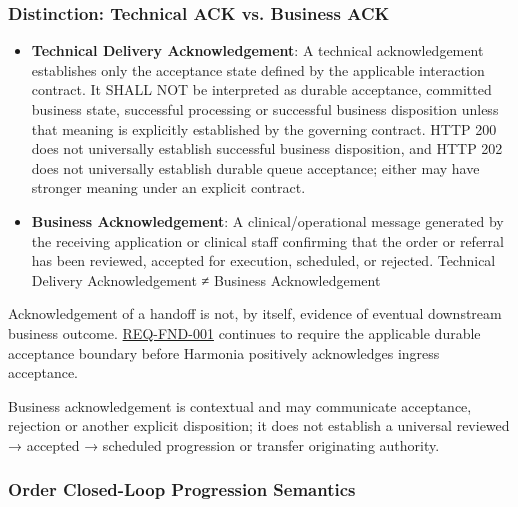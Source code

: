 \subsubsection*{Distinction: Technical ACK vs. Business ACK}
\label{rad:enabling:263}

\begin{itemize}

\item
\textbf{Technical Delivery Acknowledgement}: A technical acknowledgement establishes only the acceptance state defined by the applicable interaction contract. It SHALL NOT be interpreted as durable acceptance, committed business state, successful processing or successful business disposition unless that meaning is explicitly established by the governing contract. HTTP 200 does not universally establish successful business disposition, and HTTP 202 does not universally establish durable queue acceptance; either may have stronger meaning under an explicit contract.



\item
\textbf{Business Acknowledgement}: A clinical/\allowbreak{}operational message generated by the receiving application or clinical staff confirming that the order or referral has been reviewed, accepted for execution, scheduled, or rejected.  Technical Delivery Acknowledgement ≠  Business Acknowledgement



\end{itemize}
\label{rad:enabling:267}

Acknowledgement of a handoff is not, by itself, evidence of eventual downstream business outcome. \href{https://github.com/fhirfactory/harmonia/blob/98410db60155198a75f74c79d98060070209faa1/docs/markdown/01-motivation/requirements-constraints/foundational-requirements.md\#req-fnd-001-durable-ingress-acceptance-boundary}{REQ-FND-001} continues to require the applicable durable acceptance boundary before Harmonia positively acknowledges ingress acceptance.

\label{rad:enabling:269}

Business acknowledgement is contextual and may communicate acceptance, rejection or another explicit disposition; it does not establish a universal reviewed → accepted → scheduled progression or transfer originating authority.

\label{rad:enabling:271}
\subsubsection*{Order Closed-Loop Progression Semantics}
\label{rad:enabling:272}

